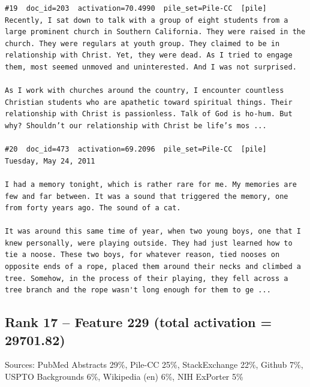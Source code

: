 \begin{verbatim}
#19  doc_id=203  activation=70.4990  pile_set=Pile-CC  [pile]
Recently, I sat down to talk with a group of eight students from a large prominent church in Southern California. They were raised in the church. They were regulars at youth group. They claimed to be in relationship with Christ. Yet, they were dead. As I tried to engage them, most seemed unmoved and uninterested. And I was not surprised.

As I work with churches around the country, I encounter countless Christian students who are apathetic toward spiritual things. Their relationship with Christ is passionless. Talk of God is ho-hum. But why? Shouldn’t our relationship with Christ be life’s mos ...

#20  doc_id=473  activation=69.2096  pile_set=Pile-CC  [pile]
Tuesday, May 24, 2011

I had a memory tonight, which is rather rare for me. My memories are few and far between. It was a sound that triggered the memory, one from forty years ago. The sound of a cat.

It was around this same time of year, when two young boys, one that I knew personally, were playing outside. They had just learned how to tie a noose. These two boys, for whatever reason, tied nooses on opposite ends of a rope, placed them around their necks and climbed a tree. Somehow, in the process of their playing, they fell across a tree branch and the rope wasn't long enough for them to ge ...

\end{verbatim}

\subsection*{Rank 17 -- Feature 229 (total activation = 29701.82)}

Sources: PubMed Abstracts 29\%, Pile-CC 25\%, StackExchange 22\%, Github 7\%, USPTO Backgrounds 6\%, Wikipedia (en) 6\%, NIH ExPorter 5\%

